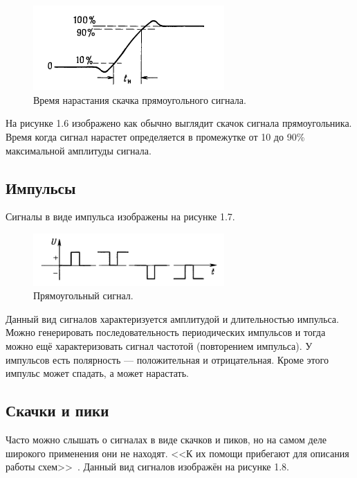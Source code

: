 	\begin{figure}[H]
    \centering
    \includegraphics[width=0.65\textwidth]{../image/s_p_t.png}
    \caption{Время нарастания скачка прямоугольного сигнала.}
	\end{figure}
	
На рисунке 1.6 изображено как обычно выглядит скачок сигнала прямоугольника. Время когда сигнал нарастет определяется в промежутке от 10 до 90\% максимальной амплитуды сигнала.

\subsection*{Импульсы}
Сигналы в виде импульса изображены на рисунке 1.7.

	\begin{figure}[H]
    \centering
    \includegraphics[width=0.65\textwidth]{../image/s_i.png}
    \caption{Прямоугольный сигнал.}
	\end{figure}
	
Данный вид сигналов характеризуется амплитудой и длительностью импульса. Можно генерировать последовательность периодических импульсов и тогда можно ещё характеризовать сигнал частотой (повторением импульса). У импульсов есть полярность --- положительная и отрицательная. Кроме этого импульс может спадать, а может нарастать. 
	


\subsection*{Скачки и пики}
Часто можно слышать о сигналах в виде скачков и пиков, но на самом деле широкого применения они не находят. <<К их помощи прибегают для описания работы схем>>~\cite{is1}. Данный вид сигналов изображён на рисунке 1.8.

